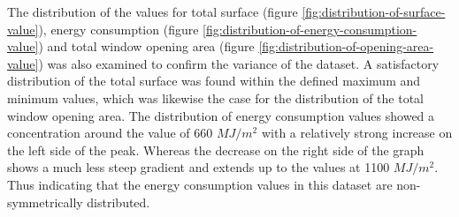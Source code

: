 \documentclass[a4paper, 12pt]{report}
\begin{document}
The distribution of the values for total surface (figure \ref{fig:distribution-of-surface-value}), energy consumption (figure \ref{fig:distribution-of-energy-consumption-value}) and total window opening area (figure \ref{fig:distribution-of-opening-area-value}) was also examined to confirm the variance of the dataset. A satisfactory distribution of the total surface was found within the defined maximum and minimum values, which was likewise the case for the distribution of the total window opening area. The distribution of energy consumption values showed a concentration around the value of 660 $MJ/m^2$ with a relatively strong increase on the left side of the peak. Whereas the decrease on the right side of the graph shows a much less steep gradient and extends up to the values at 1100 $MJ/m^2$. Thus indicating that the energy consumption values in this dataset are non-symmetrically distributed.
\end{document}
